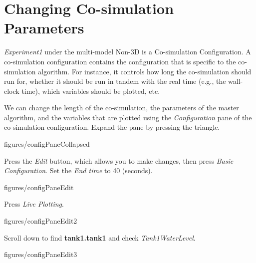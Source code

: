 \documentclass[11pt,a4paper]{../tutorial}
\begin{document}
\newpage
\section{Changing Co-simulation Parameters}

\emph{Experiment1} under the multi-model Non-3D is a Co-simulation Configuration.
A co-simulation configuration contains the configuration that is specific to the co-simulation algorithm.
For instance, it controls how long the co-simulation should run for, whether it should be run in tandem with the real time (e.g., the wall-clock time), which variables should be plotted, etc.

\begin{instructions}
\item We can change the length of the co-simulation, the parameters of the master algorithm, and the variables that are plotted using the \emph{Configuration} pane of the co-simulation configuration. Expand the pane by pressing the triangle.

    \begin{annotation}[width=0.84\linewidth,trim=0 405 0 0,clip]{figures/configPaneCollapsed}
    \end{annotation}

\item Press the \emph{Edit} button, which allows you to make changes, then press \emph{Basic Configuration}. Set the \emph{End time} to 40 (seconds).

    \begin{annotation}[width=0.84\linewidth,trim=0 100 0 0,clip]{figures/configPaneEdit}
    \end{annotation}

\item Press \emph{Live Plotting}.

    \begin{annotation}[width=0.84\linewidth,trim=0 350 0 0,clip]{figures/configPaneEdit2}
    \end{annotation}

Scroll down to find \textbf{{tank1}.tank1} and check \emph{Tank1WaterLevel}.

    \begin{annotation}[width=0.84\linewidth,trim=0 250 0 200,clip]{figures/configPaneEdit3}
    \end{annotation}


\end{instructions}
\end{document}
